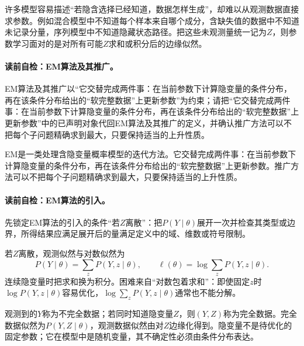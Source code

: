 \label{struct:V3-C04-CH06}
许多模型容易描述“若隐含选择已经知道，数据怎样生成”，却难以从观测数据直接求参数。例如混合模型中不知道每个样本来自哪个成分，含缺失值的数据中不知道未记录分量，序列模型中不知道隐藏状态路径。把这些未观测量统一记为$Z$，则参数学习面对的是对所有可能$Z$求和或积分后的边缘似然。

\paragraph{读前自检：EM算法及其推广。}EM算法及其推广以“它交替完成两件事：在当前参数下计算隐变量的条件分布，再在该条件分布给出的“软完整数据”上更新参数”为约束；请把“它交替完成两件事：在当前参数下计算隐变量的条件分布，再在该条件分布给出的“软完整数据”上更新参数”中的已声明对象代回EM算法及其推广的定义，并确认推广方法可以不把每个子问题精确求到最大，只要保持适当的上升性质。\par

EM是一类处理含隐变量概率模型的迭代方法。它交替完成两件事：在当前参数下计算隐变量的条件分布，再在该条件分布给出的“软完整数据”上更新参数。推广方法可以不把每个子问题精确求到最大，只要保持适当的上升性质。

\paragraph{读前自检：EM算法的引入。}先锁定EM算法的引入的条件“若$Z$离散”：把$P(Y\mid\theta)$展开一次并检查其类型或边界，所得结果应满足展开后的量满足定义中的域、维数或符号限制。\par

若$Z$离散，观测似然与对数似然为
\[
P(Y\mid\theta)=\sum_zP(Y,z\mid\theta),\qquad
\ell(\theta)=\log\sum_zP(Y,z\mid\theta).
\]
连续隐变量时把求和换为积分。困难来自“对数包着求和”：即使固定$z$时$\log P(Y,z\mid\theta)$容易优化，$\log\sum_zP(Y,z\mid\theta)$通常也不能分解。

\label{struct:V3-C04-CH07}
\begin{definition}[不完全数据与完全数据]
观测到的$Y$称为不完全数据；若同时知道隐变量$Z$，则$(Y,Z)$称为完全数据。完全数据似然为$P(Y,Z\mid\theta)$，观测数据似然由对$Z$边缘化得到。隐变量不是待优化的固定参数；它在模型中是随机变量，其不确定性必须由条件分布表达。
\end{definition}


